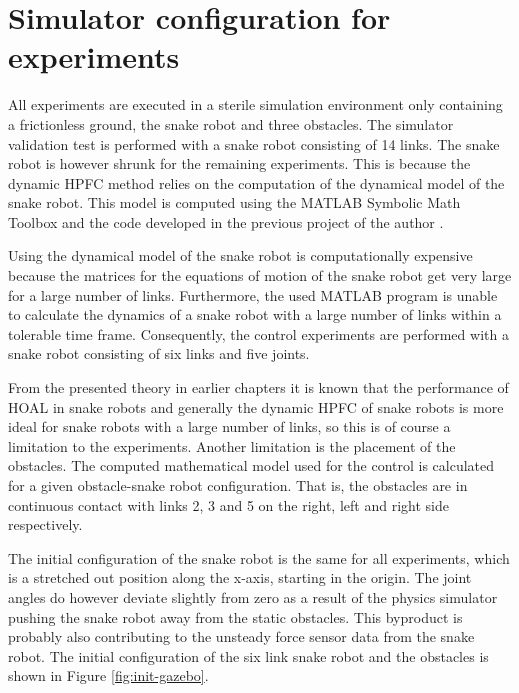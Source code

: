 \section{Simulator configuration for experiments}\label{sec:sim-config-exp}

All experiments are executed in a sterile simulation environment only containing a frictionless ground, the snake robot and three obstacles. The simulator validation test is performed with a snake robot consisting of 14 links. The snake robot is however shrunk for the remaining experiments. This is because the dynamic HPFC method relies on the computation of the dynamical model of the snake robot. This model is computed using the MATLAB Symbolic Math Toolbox \cite{matlabsymbolic} and the code developed in the previous project of the author \cite{AtussaProsjektoppgp}.

Using the dynamical model of the snake robot is computationally expensive because the matrices for the equations of motion of the snake robot get very large for a large number of links. Furthermore, the used MATLAB program is unable to calculate the dynamics of a snake robot with a large number of links within a tolerable time frame. Consequently, the control experiments are performed with a snake robot consisting of six links and five joints.

From the presented theory in earlier chapters it is known that the performance of HOAL in snake robots and generally the dynamic HPFC of snake robots is more ideal for snake robots with a large number of links, so this is of course a limitation to the experiments. Another limitation is the placement of the obstacles. The computed mathematical model used for the control is calculated for a given obstacle-snake robot configuration. That is, the obstacles are in continuous contact with links 2, 3 and 5 on the right, left and right side respectively.

The initial configuration of the snake robot is the same for all experiments, which is a stretched out position along the x-axis, starting in the origin. The joint angles do however deviate slightly from zero as a result of the physics simulator pushing the snake robot away from the static obstacles. This byproduct is probably also contributing to the unsteady force sensor data from the snake robot. The initial configuration of the six link snake robot and the obstacles is shown in Figure \ref{fig:init-gazebo}.

